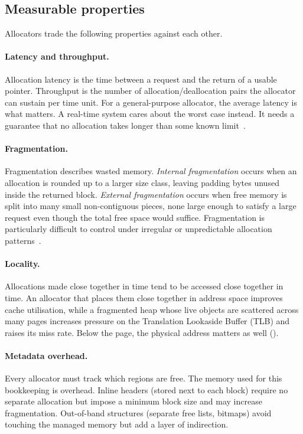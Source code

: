 \documentclass[12pt]{report}
\newcommand{\fullref}[1]{\Cref{#1}}
\renewcommand{\_}{\origunderscore\allowbreak}
\begin{document}
\subsection{Measurable properties}

Allocators trade the following properties against each other.

\paragraph{Latency and throughput.} Allocation latency is the time between a request and the return of a usable pointer. Throughput is the number of allocation/deallocation pairs the allocator can sustain per time unit. For a general-purpose allocator, the average latency is what matters. A real-time system cares about the worst case instead. It needs a guarantee that no allocation takes longer than some known limit~\cite{masmano2004tlsf}.

\paragraph{Fragmentation.} Fragmentation describes wasted memory. \emph{Internal fragmentation} occurs when an allocation is rounded up to a larger size class, leaving padding bytes unused inside the returned block. \emph{External fragmentation} occurs when free memory is split into many small non-contiguous pieces, none large enough to satisfy a large request even though the total free space would suffice. Fragmentation is particularly difficult to control under irregular or unpredictable allocation patterns~\cite{wilson1995survey}.

\paragraph{Locality.} Allocations made close together in time tend to be accessed close together in time. An allocator that places them close together in address space improves cache utilisation, while a fragmented heap whose live objects are scattered across many pages increases pressure on the Translation Lookaside Buffer (TLB) and raises its miss rate. Below the page, the physical address matters as well (\fullref{sec:bg-physical}).

\paragraph{Metadata overhead.} Every allocator must track which regions are free. The memory used for this bookkeeping is overhead. Inline headers (stored next to each block) require no separate allocation but impose a minimum block size and may increase fragmentation. Out-of-band structures (separate free lists, bitmaps) avoid touching the managed memory but add a layer of indirection.
\end{document}
